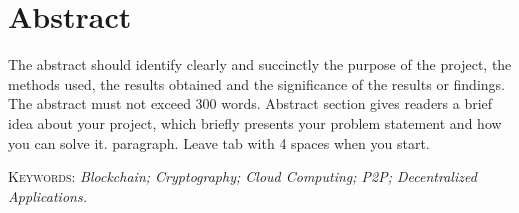 \chapter*{Abstract}

The abstract should identify clearly and succinctly the purpose of the project, the methods used, the results obtained and the significance of the results or findings. The abstract must not exceed 300 words. Abstract section gives readers a brief idea about your project, which briefly presents your problem statement and how you can solve it. paragraph. Leave tab with 4 spaces when you start.


\vspace{1cm}
\noindent
\textsc{Keywords}: \textsl{ Blockchain; Cryptography; Cloud Computing; P2P; Decentralized Applications.}